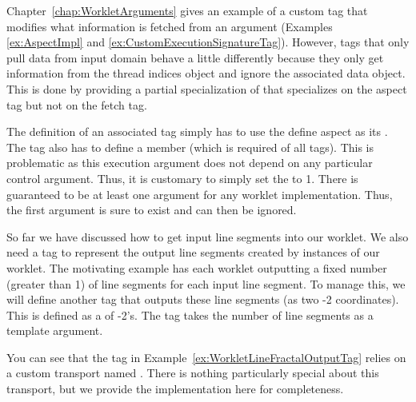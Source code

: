 Chapter~\ref{chap:WorkletArguments} gives an example of a custom \executionsignature tag that modifies what information is fetched from an argument (Examples \ref{ex:AspectImpl} and \ref{ex:CustomExecutionSignatureTag}).
However, \executionsignature tags that only pull data from input domain behave a little differently because they only get information from the thread indices object and ignore the associated data object.
This is done by providing a partial specialization of  that specializes on the aspect tag but not on the fetch tag.


The definition of an associated \executionsignature tag simply has to use the define aspect as its .
The tag also has to define a  member (which is required of all \executionsignature tags).
This is problematic as this execution argument does not depend on any particular control argument.
Thus, it is customary to simply set the  to 1.
There is guaranteed to be at least one \controlsignature argument for any worklet implementation.
Thus, the first argument is sure to exist and can then be ignored.


So far we have discussed how to get input line segments into our worklet.
We also need a \controlsignature tag to represent the output line segments created by instances of our worklet.
The motivating example has each worklet outputting a fixed number (greater than 1) of line segments for each input line segment.
To manage this, we will define another \controlsignature tag that outputs these line segments (as two -2 coordinates).
This is defined as a  of -2's.
The tag takes the number of line segments as a template argument.


You can see that the tag in Example~\ref{ex:WorkletLineFractalOutputTag} relies on a custom transport named .
There is nothing particularly special about this transport, but we provide the implementation here for completeness.

